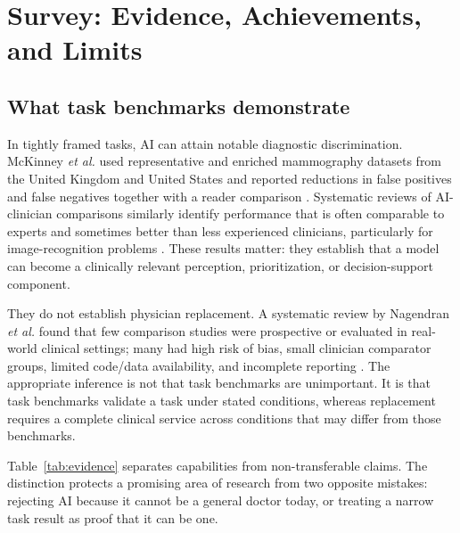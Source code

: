 \documentclass[conference]{IEEEtran}
\begin{document}
\section{Survey: Evidence, Achievements, and Limits}

\subsection{What task benchmarks demonstrate}

In tightly framed tasks, AI can attain notable diagnostic discrimination. McKinney \textit{et al.} used representative and enriched mammography datasets from the United Kingdom and United States and reported reductions in false positives and false negatives together with a reader comparison \cite{mckinney2020}. Systematic reviews of AI-clinician comparisons similarly identify performance that is often comparable to experts and sometimes better than less experienced clinicians, particularly for image-recognition problems \cite{shen2019,topol2019}. These results matter: they establish that a model can become a clinically relevant perception, prioritization, or decision-support component.

They do not establish physician replacement. A systematic review by Nagendran \textit{et al.} found that few comparison studies were prospective or evaluated in real-world clinical settings; many had high risk of bias, small clinician comparator groups, limited code/data availability, and incomplete reporting \cite{nagendran2020}. The appropriate inference is not that task benchmarks are unimportant. It is that task benchmarks validate a task under stated conditions, whereas replacement requires a complete clinical service across conditions that may differ from those benchmarks.

Table~\ref{tab:evidence} separates capabilities from non-transferable claims. The distinction protects a promising area of research from two opposite mistakes: rejecting AI because it cannot be a general doctor today, or treating a narrow task result as proof that it can be one.
\end{document}
